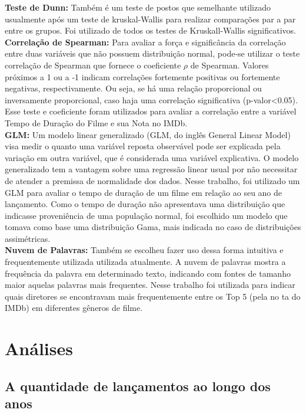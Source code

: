 \documentclass[a4paper, 12pt]{article} %
\begin{document}
\textbf{Teste de Dunn:} Também é um teste de postos que semelhante utilizado usualmente após um teste de kruskal-Wallis para realizar comparações par a par entre os grupos. Foi utilizado  de todos os testes de Kruskall-Wallis significativos.\\

\textbf{Correlação de Spearman:} Para avaliar a força e significância da correlação entre duas variáveis que não possuem distribuição normal, pode-se utilizar o teste correlação de Spearman que fornece o coeficiente $\rho$ de Spearman. Valores próximos a 1 ou a -1 indicam correlações fortemente positivas ou fortemente negativas, respectivamente. Ou seja, se há uma relação proporcional ou inversamente proporcional, caso haja uma correlação significativa (p-valor<0.05). Esse teste e coeficiente foram utilizados para avaliar a correlação entre a variável Tempo de Duração do Filme e sua Nota no IMDb. \\

\textbf{GLM:} Um modelo linear generalizado (GLM, do inglês General Linear Model) visa medir o quanto uma variável reposta observável pode ser explicada pela variação em outra variável, que é considerada uma variável explicativa. O modelo generalizado tem a vantagem sobre uma regressão linear usual por não necessitar de atender a premissa de normalidade dos dados. Nesse trabalho, foi utilizado um GLM para avaliar o tempo de duração de um filme em relação ao seu ano de lançamento. Como o tempo de duração não apresentava uma distribuição que indicasse proveniência de uma população normal, foi escolhido um modelo que tomava como base uma distribuição Gama, mais indicada no caso de distribuições assimétricas.\\

\textbf{Nuvem de Palavras:} Também se escolheu fazer uso dessa  forma intuitiva e frequentemente utilizada utilizada atualmente. A nuvem de palavras mostra a frequência da palavra em determinado texto, indicando com fontes de tamanho maior aquelas palavras mais frequentes. Nesse trabalho foi utilizada para indicar quais diretores se encontravam mais frequentemente entre os Top 5 (pela no ta do IMDb) em diferentes gêneros de filme.  \\

\section{Análises}

\subsection {A quantidade de lançamentos ao longo dos anos}\\
\end{document}
